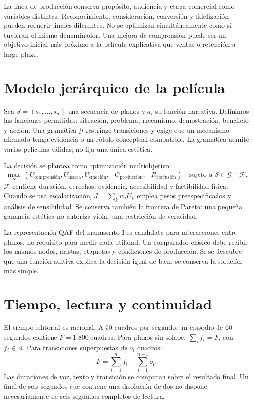 La línea de producción conserva propósito, audiencia y etapa comercial como variables distintas. Reconocimiento, consideración, conversión y fidelización pueden requerir finales diferentes. No se optimizan simultáneamente como si tuvieran el mismo denominador. Una mejora de comprensión puede ser un objetivo inicial más próximo a la película explicativa que ventas o retención a largo plazo.

\section{Modelo jerárquico de la película}
Sea $S=(s_1,\ldots,s_n)$ una secuencia de planos y $a_i$ su función narrativa. Definimos las funciones permitidas: situación, problema, mecanismo, demostración, beneficio y acción. Una gramática $\mathcal G$ restringe transiciones y exige que un mecanismo afirmado tenga evidencia o un rótulo conceptual compatible. La gramática admite varias películas válidas; no fija una única estética.

La decisión se plantea como optimización multiobjetivo:
\begin{equation}
 \max_S\ \left(U_{\mathrm{comprensión}},U_{\mathrm{marca}},U_{\mathrm{emoción}},-C_{\mathrm{producción}},-R_{\mathrm{confusión}}\right)
 \quad\text{sujeto a }S\in\mathcal G\cap\mathcal F.
\end{equation}
$\mathcal F$ contiene duración, derechos, evidencia, accesibilidad y factibilidad física. Cuando se usa escalarización, $J=\sum_kw_k\widetilde U_k$ emplea pesos preespecificados y análisis de sensibilidad. Se conserva también la frontera de Pareto: una pequeña ganancia estética no autoriza violar una restricción de veracidad.

La representación QAF del manuscrito I es candidata para interacciones entre planos, no requisito para medir cada utilidad. Un comparador clásico debe recibir los mismos nodos, aristas, etiquetas y condiciones de producción. Si se descubre que una función aditiva explica la decisión igual de bien, se conserva la solución más simple.

\section{Tiempo, lectura y continuidad}
El tiempo editorial es racional. A 30 cuadros por segundo, un episodio de 60 segundos contiene $F=1.800$ cuadros. Para planos sin solape, $\sum_if_i=F$, con $f_i\in\mathbb N$. Para transiciones superpuestas de $o_i$ cuadros:
\begin{equation}
 F=\sum_{i=1}^nf_i-\sum_{i=1}^{n-1}o_i.
\end{equation}
Las duraciones de voz, texto y transición se computan sobre el resultado final. Un final de seis segundos que contiene una disolución de dos no dispone necesariamente de seis segundos completos de lectura.

